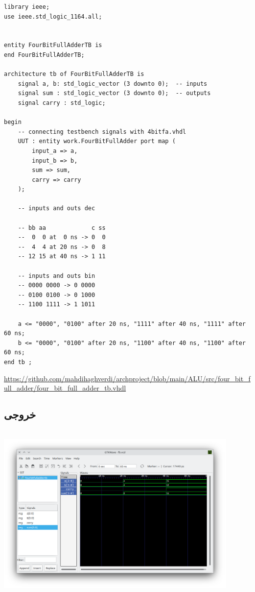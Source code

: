 \documentclass[dvipsnames, svgnames, x11names, a4paper, 11pt, oneside]{book}
\begin{document}
						\begin{latin}
							\begin{lstlisting}
library ieee;
use ieee.std_logic_1164.all;


entity FourBitFullAdderTB is
end FourBitFullAdderTB;

architecture tb of FourBitFullAdderTB is
	signal a, b: std_logic_vector (3 downto 0);  -- inputs
	signal sum : std_logic_vector (3 downto 0);  -- outputs
	signal carry : std_logic;

begin
	-- connecting testbench signals with 4bitfa.vhdl
	UUT : entity work.FourBitFullAdder port map (
		input_a => a,
		input_b => b,
		sum => sum,
		carry => carry
	);
	
	-- inputs and outs dec
	
	-- bb aa             c ss
	--  0  0 at  0 ns -> 0  0
	--  4  4 at 20 ns -> 0  8
	-- 12 15 at 40 ns -> 1 11
	
	-- inputs and outs bin
	-- 0000 0000 -> 0 0000
	-- 0100 0100 -> 0 1000
	-- 1100 1111 -> 1 1011
	
	a <= "0000", "0100" after 20 ns, "1111" after 40 ns, "1111" after 60 ns;
	b <= "0000", "0100" after 20 ns, "1100" after 40 ns, "1100" after 60 ns;
end tb ;
							\end{lstlisting}
							\url{https://github.com/mahdihaghverdi/archproject/blob/main/ALU/src/four_bit_full_adder/four_bit_full_adder_tb.vhdl}
						\end{latin}
					\subsection{خروجی }
						\begin{center}	
							\includegraphics[width=12cm, height=9cm]{./images/four_bit_full_adder_vcd}
						\end{center}
\end{document}
